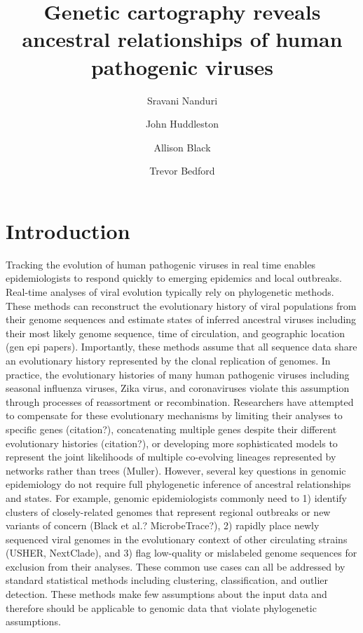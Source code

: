 \documentclass[9pt,lineno]{elife}
\title{Genetic cartography reveals ancestral relationships of human pathogenic viruses}
\author[1]{Sravani Nanduri}
\author[2]{John Huddleston}
\author[2]{Allison Black}
\author[2*]{Trevor Bedford}
\affil[1]{Issaquah High School, Issaquah, WA, USA}
\affil[2]{Vaccine and Infectious Disease Division, Fred Hutchinson Cancer Research Center, Seattle, WA, USA}
\date{}
\begin{document}
\maketitle

\begin{abstract}
\end{abstract}

\section*{Introduction}

Tracking the evolution of human pathogenic viruses in real time enables epidemiologists to respond quickly to emerging epidemics and local outbreaks.
Real-time analyses of viral evolution typically rely on phylogenetic methods.
These methods can reconstruct the evolutionary history of viral populations from their genome sequences and estimate states of inferred ancestral viruses including their most likely genome sequence, time of circulation, and geographic location (gen epi papers).
Importantly, these methods assume that all sequence data share an evolutionary history represented by the clonal replication of genomes.
In practice, the evolutionary histories of many human pathogenic viruses including seasonal influenza viruses, Zika virus, and coronaviruses violate this assumption through processes of reassortment or recombination.
Researchers have attempted to compensate for these evolutionary mechanisms by limiting their analyses to specific genes (citation?), concatenating multiple genes despite their different evolutionary histories (citation?), or developing more sophisticated models to represent the joint likelihoods of multiple co-evolving lineages represented by networks rather than trees (Muller).
However, several key questions in genomic epidemiology do not require full phylogenetic inference of ancestral relationships and states.
For example, genomic epidemiologists commonly need to 1) identify clusters of closely-related genomes that represent regional outbreaks or new variants of concern (Black et al.? MicrobeTrace?), 2) rapidly place newly sequenced viral genomes in the evolutionary context of other circulating strains (USHER, NextClade), and 3) flag low-quality or mislabeled genome sequences for exclusion from their analyses.
These common use cases can all be addressed by standard statistical methods including clustering, classification, and outlier detection.
These methods make few assumptions about the input data and therefore should be applicable to genomic data that violate phylogenetic assumptions.
\end{document}
